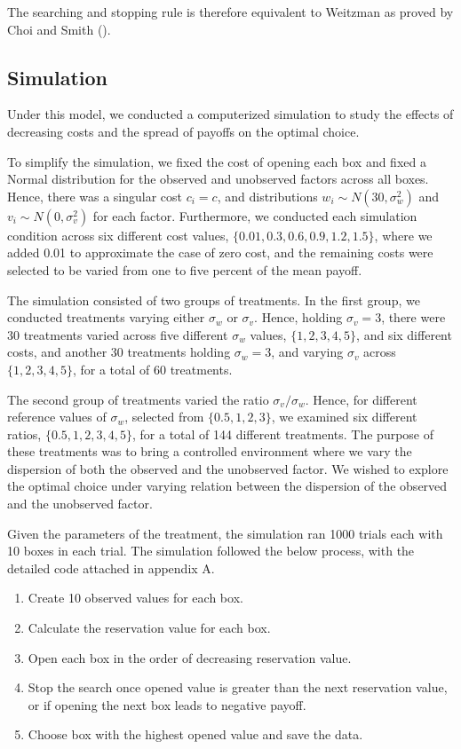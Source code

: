 \documentclass[12pt]{article}
\begin{document}
The searching and stopping rule is therefore equivalent to Weitzman as proved by Choi and Smith (\citeyear{Choi}).

\subsection{Simulation}
Under this model, we conducted a computerized simulation to study the effects of decreasing costs and the spread of payoffs on the optimal choice.

To simplify the simulation, we fixed the cost of opening each box and fixed a Normal distribution for the observed and unobserved factors across all boxes. Hence, there was a singular cost \(c_i=c\), and distributions \(w_i\sim N(30, \sigma^2_w)\) and \(v_i\sim N(0,\sigma^2_v)\) for each factor. Furthermore, we conducted each simulation condition across six different cost values, \(\{0.01, 0.3, 0.6, 0.9, 1.2, 1.5\}\), where we added 0.01 to approximate the case of zero cost, and the remaining costs were selected to be varied from one to five percent of the mean payoff.

The simulation consisted of two groups of treatments. In the first group, we conducted treatments varying either \(\sigma_w\) or \(\sigma_v\). Hence, holding \(\sigma_v=3\), there were 30 treatments varied across five different \(\sigma_w\) values, \(\{1,2,3,4,5\}\), and six different costs, and another 30 treatments holding \(\sigma_w=3\), and varying \(\sigma_v\) across \(\{1,2,3,4,5\}\), for a total of 60 treatments.

The second group of treatments varied the ratio \(\sigma_v/\sigma_w\). Hence, for different reference values of \(\sigma_w\), selected from \(\{0.5, 1, 2, 3\}\), we examined six different ratios, \(\{0.5, 1, 2, 3, 4, 5\}\), for a total of 144 different treatments. The purpose of these treatments was to bring a controlled environment where we vary the dispersion of both the observed and the unobserved factor. We wished to explore the optimal choice under varying relation between the dispersion of the observed and the unobserved factor.

Given the parameters of the treatment, the simulation ran 1000 trials each with 10 boxes in each trial. The simulation followed the below process, with the detailed code attached in appendix A.
\begin{enumerate}
    \item Create 10 observed values for each box.
    \item Calculate the reservation value for each box.
    \item Open each box in the order of decreasing reservation value.
    \item Stop the search once opened value is greater than the next reservation value, or if opening the next box leads to negative payoff.
    \item Choose box with the highest opened value and save the data.
\end{enumerate}
\end{document}
